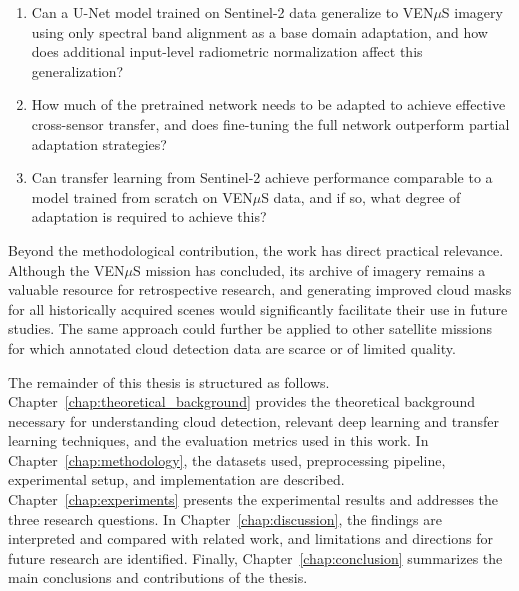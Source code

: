 \begin{enumerate}
    \item Can a U-Net model trained on Sentinel-2 data generalize to VEN$\mu$S imagery using only spectral band alignment as a base domain adaptation, and how does additional input-level radiometric normalization     affect this generalization?
    \item How much of the pretrained network needs to be adapted to achieve effective cross-sensor transfer, and does fine-tuning the full network outperform partial adaptation strategies?
    \item Can transfer learning from Sentinel-2 achieve performance comparable to a model trained from scratch on VEN$\mu$S data, and if so, what degree of adaptation is required to achieve this?
\end{enumerate}

Beyond the methodological contribution, the work has direct practical relevance. Although the VEN$\mu$S mission has concluded, its archive of imagery remains a valuable resource for retrospective research, and generating improved cloud masks for all historically acquired scenes would significantly facilitate their use in future studies. The same approach could further be applied to other satellite missions for which annotated cloud detection data are scarce or of limited quality.

The remainder of this thesis is structured as follows. Chapter~\ref{chap:theoretical_background} provides the theoretical background necessary for understanding cloud detection, relevant deep learning and transfer learning techniques, and the evaluation metrics used in this work. In Chapter~\ref{chap:methodology}, the datasets used, preprocessing pipeline, experimental setup, and implementation are described. Chapter~\ref{chap:experiments} presents the experimental results and addresses the three research questions. In Chapter~\ref{chap:discussion}, the findings are interpreted and compared with related work, and limitations and directions for future research are identified. Finally, Chapter~\ref{chap:conclusion} summarizes the main conclusions and contributions of the thesis.